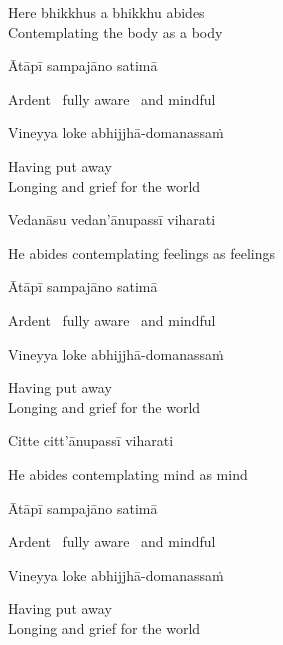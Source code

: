 \begin{english}
  Here bhikkhus a bhikkhu abides\\
  Contemplating the body as a body
\end{english}

Ātāpī sampajāno satimā

\begin{english}
  Ardent \breathmark\ fully aware \breathmark\ and mindful
\end{english}

Vineyya loke abhijjhā-domanassaṁ

\begin{english}
  Having put away\\
  Longing and grief for the world\makeatletter\hyperlink{endnote62-appendix}\makeatother
\end{english}

Vedanāsu vedan'ānupassī viharati

\begin{english}
  He abides contemplating feelings as feelings
\end{english}

Ātāpī sampajāno satimā

\begin{english}
  Ardent \breathmark\ fully aware \breathmark\ and mindful
\end{english}

Vineyya loke abhijjhā-domanassaṁ

\begin{english}
  Having put away\\
  Longing and grief for the world
\end{english}

Citte citt'ānupassī viharati

\begin{english}
  He abides contemplating mind as mind
\end{english}

Ātāpī sampajāno satimā

\begin{english}
  Ardent \breathmark\ fully aware \breathmark\ and mindful
\end{english}

Vineyya loke abhijjhā-domanassaṁ

\begin{english}
  Having put away\\
  Longing and grief for the world
\end{english}

